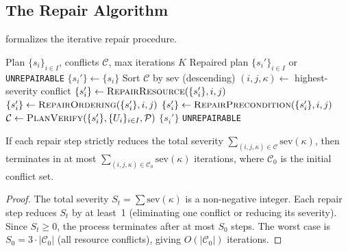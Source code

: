 \documentclass[11pt]{article}
\newcommand{\PlanSheaf}{\mathcal{P}}
\newcommand{\PlanVerify}{\textsc{PlanVerify}}
\newcommand{\PlanRepair}{\textsc{PlanRepair}}
\newcommand{\CoverFam}{\{U_i\}_{i \in I}}
\newcommand{\ConflictSet}{\mathcal{C}}
\newcommand{\Severity}{\mathrm{sev}}
\begin{document}
\subsection{The Repair Algorithm}\label{ssec:repair-alg}

 formalizes the iterative repair procedure.

\begin{algorithm}[ht]
\caption{$\PlanRepair$: Iterative Plan Repair via Obstruction Analysis}
\label{alg:repair}
\begin{algorithmic}[1]
\REQUIRE Plan $\{s_i\}_{i \in I}$, conflicts $\ConflictSet$, max iterations $K$
\ENSURE Repaired plan $\{s_i'\}_{i \in I}$ or \texttt{UNREPAIRABLE}
\STATE $\{s_i'\} \leftarrow \{s_i\}$ 
  \STATE Sort $\ConflictSet$ by $\Severity$ (descending)
  \STATE $(i, j, \kappa) \leftarrow$ highest-severity conflict
    \STATE $\{s_i'\} \leftarrow \textsc{RepairResource}(\{s_i'\}, i, j)$
    \STATE $\{s_i'\} \leftarrow \textsc{RepairOrdering}(\{s_i'\}, i, j)$
  \ELSE
    \STATE $\{s_i'\} \leftarrow \textsc{RepairPrecondition}(\{s_i'\}, i, j)$
  \ENDIF
  \STATE $\ConflictSet \leftarrow \PlanVerify(\{s_i'\}, \CoverFam, \PlanSheaf)$
  \IF{$\ConflictSet = \emptyset$}
    \RETURN $\{s_i'\}$ 
  \ENDIF
\ENDFOR
\RETURN \texttt{UNREPAIRABLE}
\end{algorithmic}
\end{algorithm}

\begin{theorem}\label{thm:repair-conv}
  If each repair step strictly reduces the total severity
  $\sum_{(i,j,\kappa) \in \ConflictSet} \Severity(\kappa)$,
  then  terminates in at most
  $\sum_{(i,j,\kappa) \in \ConflictSet_0} \Severity(\kappa)$
  iterations, where $\ConflictSet_0$ is the initial conflict set.
\end{theorem}

\begin{proof}
  The total severity $S_t = \sum \Severity(\kappa)$ is a
  non-negative integer.  Each repair step reduces $S_t$ by
  at least~1 (eliminating one conflict or reducing its severity).
  Since $S_t \geq 0$, the process terminates after at most $S_0$
  steps.  The worst case is $S_0 = 3 \cdot |\ConflictSet_0|$
  (all resource conflicts), giving $O(|\ConflictSet_0|)$
  iterations.
\end{proof}
\end{document}
